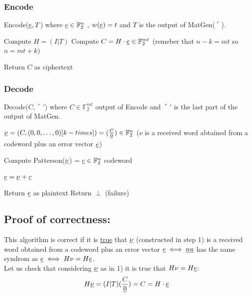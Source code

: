 \subsubsection{Encode}
Encode($\underline{e}, T$) where $\underline{e} \in \mathbb{F}_2^n$ , $w(\underline{e}) = t$ and $T$ is the output of MatGen($\ulcorner$).

\begin{algorithm}
\begin{algorithmic}[1]

    \State Compute $H= (I|T)$
    \State Compute $C=H\cdot \underline{e} \in \mathbb{F}_2^{mt}$ (remeber that $n-k = mt$ so $n = mt + k$)

    \State Return $C$ as ciphertext

\end{algorithmic}
\end{algorithm}

\subsubsection{Decode}
Decode($C, \ulcorner'$) where $C \in \mathbb{F}_2^{mt}$ output of Encode and $\ulcorner'$ is the last part of the output of MatGen.

\begin{algorithm}
\begin{algorithmic}[1]

    \State $\underline{\nu} = (C, (0, 0, \ldots, 0) [k-times]) = (\frac{C}{\underline{0}}) \in \mathbb{F}_2^n$ ($\nu$ is a received word abtained from a codeword plus an error vector $\underline{e}$)

    \State Compute Patterson($\underline{\nu}$) = $\underline{c} \in \mathbb{F}_2^n$ codeword 

    \State $\underline{e} = \underline{\nu} + \underline{c}$

        \State Return $\underline{e}$ as plaintext
    \Else
        \State Return $\perp$ (failure)
    \EndIf
\end{algorithmic}
\end{algorithm}


\subsection*{Proof of correctness:}
This algorithm is correct if it is \underline{true} that $\underline{\nu}$  (constructed in step 1) is a received word obtained from a codeword plus an error vector $\underline{e} \iff \underline{nu}$ has the same syndrom as $\underline{e} \iff H\nu = H\underline{e}$.\\
Let us check that considering $\underline{\nu}$ as in 1) it is true that $H\nu = H\underline{e}$:
\begin{align*}
    H\underline{\nu} = (I|T)(\frac{C}{\underline{0}}) = C = H\cdot \underline{e}
\end{align*}


